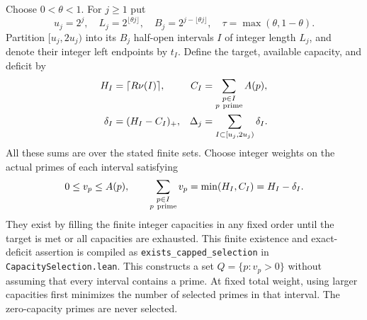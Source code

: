 \documentclass[11pt]{article}
\theoremstyle{definition}
\begin{document}
Choose $0<\theta<1$. For $j\ge1$ put
\[
 u_j=2^j,\quad L_j=2^{\lfloor\theta j\rfloor},\quad
 B_j=2^{j-\lfloor\theta j\rfloor},\quad
 \tau=\max(\theta,1-\theta).
\]
Partition $[u_j,2u_j)$ into its $B_j$ half-open intervals $I$ of
integer length $L_j$, and denote their integer left endpoints by
$t_I$. Define the target, available capacity, and deficit by
\begin{equation}
 \begin{aligned}
 H_I&=\lceil R\nu(I)\rceil,&
 C_I&=\sum_{\substack{p\in I\\p\ {\rm prime}}}A(p),\\
 \delta_I&=(H_I-C_I)_+,&
 \Delta_j&=\sum_{I\subset[u_j,2u_j)}\delta_I.
 \end{aligned}
 \label{eq:reverse-capacity-deficit}
\end{equation}
All these sums are over the stated finite sets. Choose integer
weights on the actual primes of each interval satisfying
\begin{equation}
 0\le v_p\le A(p),\qquad
 \sum_{\substack{p\in I\\p\ {\rm prime}}}v_p
          =\min(H_I,C_I)=H_I-\delta_I.
 \label{eq:capped-prime-selection}
\end{equation}
They exist by filling the finite integer capacities in any fixed
order until the target is met or all capacities are exhausted.
This finite existence and exact-deficit assertion is compiled as
\texttt{exists\_capped\_selection} in
\texttt{CapacitySelection.lean}.
This constructs a set $Q=\{p:v_p>0\}$ without assuming that every
interval contains a prime. At fixed total weight, using larger
capacities first minimizes the number of selected primes in that
interval. The zero-capacity primes are never selected.
\end{document}
